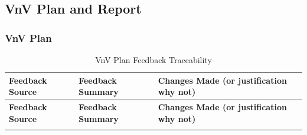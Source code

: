 \documentclass{article}
\begin{document}
\subsection{VnV Plan and Report}
\subsubsection{VnV Plan}

\begin{longtable}{|>{\raggedright\arraybackslash}p{}|>{\raggedright\arraybackslash}p{}|>{\raggedright\arraybackslash}p{}|}
\caption{VnV Plan Feedback Traceability}
\label{tab:vnv-feedback-traceability}\\
\hline
\textbf{Feedback Source} & \textbf{Feedback Summary} & \textbf{Changes Made (or justification why not)} \\
\hline
\endfirsthead

\hline
\textbf{Feedback Source} & \textbf{Feedback Summary} & \textbf{Changes Made (or justification why not)} \\
\hline
\endhead

\hline
\endfoot


\end{longtable}
\end{document}
